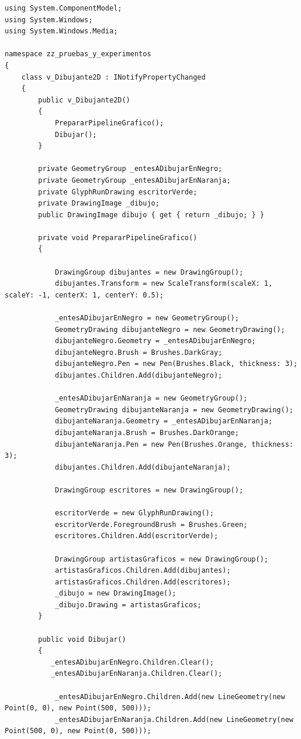 \documentclass[spanish,12pt,a4paper,final,oneside]{book}
\begin{document}
\begin{lstlisting}[frame=single] 
using System.ComponentModel;
using System.Windows;
using System.Windows.Media;
 
namespace zz_pruebas_y_experimentos
{
	class v_Dibujante2D : INotifyPropertyChanged
	{
    	public v_Dibujante2D()
    	{
            PrepararPipelineGrafico();
        	Dibujar();
    	}
 
    	private GeometryGroup _entesADibujarEnNegro;
    	private GeometryGroup _entesADibujarEnNaranja;
    	private GlyphRunDrawing escritorVerde;
    	private DrawingImage _dibujo;
    	public DrawingImage dibujo { get { return _dibujo; } }
 
    	private void PrepararPipelineGrafico()
    	{
 
        	DrawingGroup dibujantes = new DrawingGroup();
        	dibujantes.Transform = new ScaleTransform(scaleX: 1, scaleY: -1, centerX: 1, centerY: 0.5);
 
        	_entesADibujarEnNegro = new GeometryGroup();
        	GeometryDrawing dibujanteNegro = new GeometryDrawing();
        	dibujanteNegro.Geometry = _entesADibujarEnNegro;
        	dibujanteNegro.Brush = Brushes.DarkGray;
        	dibujanteNegro.Pen = new Pen(Brushes.Black, thickness: 3);
            dibujantes.Children.Add(dibujanteNegro);
 
        	_entesADibujarEnNaranja = new GeometryGroup();
        	GeometryDrawing dibujanteNaranja = new GeometryDrawing();
        	dibujanteNaranja.Geometry = _entesADibujarEnNaranja;
    	    dibujanteNaranja.Brush = Brushes.DarkOrange;
        	dibujanteNaranja.Pen = new Pen(Brushes.Orange, thickness: 3);
            dibujantes.Children.Add(dibujanteNaranja);
 
        	DrawingGroup escritores = new DrawingGroup();
 
        	escritorVerde = new GlyphRunDrawing();
        	escritorVerde.ForegroundBrush = Brushes.Green;
            escritores.Children.Add(escritorVerde);
 
        	DrawingGroup artistasGraficos = new DrawingGroup();
            artistasGraficos.Children.Add(dibujantes);
            artistasGraficos.Children.Add(escritores);
        	_dibujo = new DrawingImage();
        	_dibujo.Drawing = artistasGraficos;
    	}
 
    	public void Dibujar()
    	{
           _entesADibujarEnNegro.Children.Clear();
           _entesADibujarEnNaranja.Children.Clear();
 
        	_entesADibujarEnNegro.Children.Add(new LineGeometry(new Point(0, 0), new Point(500, 500)));
        	_entesADibujarEnNaranja.Children.Add(new LineGeometry(new Point(500, 0), new Point(0, 500)));
 

\end{lstlisting}
\end{document}
